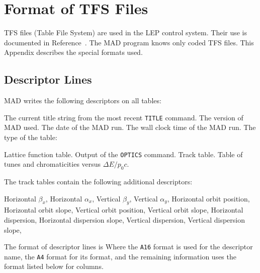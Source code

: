 \chapter{Format of TFS Files}
\label{S-TFS}
 
TFS files (Table File System) are used in the LEP control system.
Their use is documented in Reference~\cite{B-TFS}.
The MAD program knows only coded TFS files.
This Appendix describes the special formats used.
 
\section{Descriptor Lines}
MAD writes the following descriptors on all tables:
\begin{mylist}
The current title string from the most recent {\tt TITLE} command.
The version of MAD used.
The date of the MAD run.
The wall clock time of the MAD run.
The type of the table:
\begin{mylist}
Lattice function table.
Output of the {\tt OPTICS} command.
Track table.
Table of tunes and chromaticities versus \(\Delta E/p_0 c\).
\end{mylist}
\end{mylist}
The track tables contain the following additional descriptors:
\begin{mylist}
Horizontal \(\beta_x\),
Horizontal \(\alpha_x\),
Vertical \(\beta_y\),
Vertical \(\alpha_y\),
Horizontal orbit position,
Horizontal orbit slope,
Vertical orbit position,
Vertical orbit slope,
Horizontal dispersion,
Horizontal dispersion slope,
Vertical dispersion,
Vertical dispersion slope,
\end{mylist}
The format of descriptor lines is
Where the {\tt A16} format is used for the descriptor name,
the {\tt A4} format for its format,
and the remaining information uses the format listed below for columns.
 
